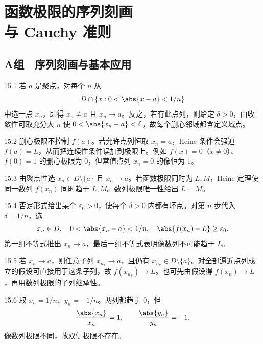 \chapter[函数极限的序列刻画与 Cauchy 准则]{函数极限的序列刻画\\与 Cauchy 准则}

\section*{A组　序列刻画与基本应用}

\begin{solution}{15.1}
若 \(a\) 是聚点，对每个 \(n\) 从
\[
 D\cap\{x:0<\abs{x-a}<1/n\}
\]
中选一点 \(x_n\)，即得 \(x_n\ne a\) 且 \(x_n\to a\)。反之，若有此点列，则给定 \(\delta>0\)，由收敛性可取充分大 \(n\) 使 \(0<\abs{x_n-a}<\delta\)，故每个删心邻域都含定义域点。
\end{solution}

\begin{solution}{15.2}
删心极限不控制 \(f(a)\)。若允许点列恒取 \(x_n=a\)，Heine 条件会强迫 \(f(a)=L\)，从而把连续性条件误加到极限上。例如 \(f(x)=0\)（\(x\ne0\)）、\(f(0)=1\) 的删心极限为 \(0\)，但常值点列 \(x_n=0\) 的像恒为 \(1\)。
\end{solution}

\begin{solution}{15.3}
由聚点性选 \(x_n\in D\setminus\{a\}\) 且 \(x_n\to a\)。若函数极限同时为 \(L,M\)，Heine 定理使同一数列 \(f(x_n)\) 同时趋于 \(L,M\)。数列极限唯一性给出 \(L=M\)。
\end{solution}

\begin{solution}{15.4}
否定形式给出某个 \(\varepsilon_0>0\)，使每个 \(\delta>0\) 内都有坏点。对第 \(n\) 步代入 \(\delta=1/n\)，选
\[
 x_n\in D,\quad0<\abs{x_n-a}<1/n,\quad
 \abs{f(x_n)-L}\ge\varepsilon_0.
\]
第一组不等式推出 \(x_n\to a\)，最后一组不等式表明像数列不可能趋于 \(L\)。
\end{solution}

\begin{solution}{15.5}
若 \(x_n\to a\)，则任意子列 \(x_{n_k}\to a\)，且仍有 \(x_{n_k}\in D\setminus\{a\}\)。对全部逼近点列成立的假设可直接用于这条子列，故 \(f(x_{n_k})\to L\)。也可先由假设得 \(f(x_n)\to L\)，再用数列极限的子列继承性。
\end{solution}

\begin{solution}{15.6}
取 \(x_n=1/n\)、\(y_n=-1/n\)。两列都趋于 \(0\)，但
\[
 \frac{\abs{x_n}}{x_n}=1,\qquad
 \frac{\abs{y_n}}{y_n}=-1.
\]
像数列极限不同，故双侧极限不存在。
\end{solution}


